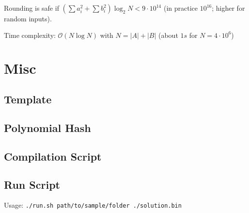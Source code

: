 \documentclass{article}
\begin{document}
Rounding is safe if $(\sum a_i^2 + \sum b_i^2)\log_2{N} < 9\cdot10^{14}$
(in practice $10^{16}$; higher for random inputs).

Time complexity: $\mathcal{O}(N \log N)$ with $N = |A|+|B|$ (about $1s$ for $N=4 \cdot 10^6$)


\pagebreak

\section*{Misc}

\subsection*{Template}


\subsection*{Polynomial Hash}


\subsection*{Compilation Script}


\subsection*{Run Script}
Usage: \lstinline{./run.sh path/to/sample/folder ./solution.bin}

\end{document}
